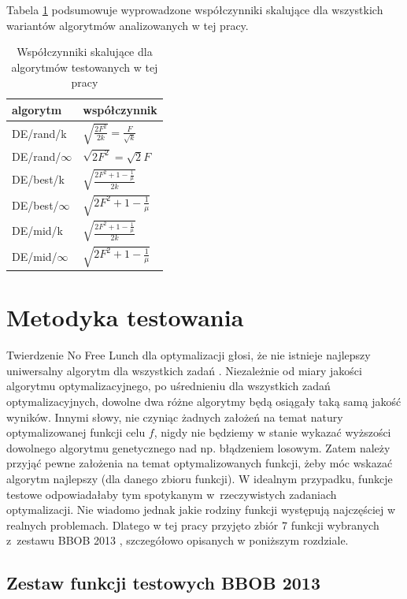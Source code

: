 \documentclass[a4paper,onecolumn,oneside,12pt,wide,floatssmall]{mwrep}
\theoremstyle{definition}
\theoremstyle{plain}%
\theoremstyle{remark}
\begin{document}
Tabela \ref{table:wspolczynniki} podsumowuje wyprowadzone współczynniki skalujące dla wszystkich
wariantów algorytmów analizowanych w tej pracy.

\begin{table}[H]
\centering
\begin{tabular}{ l | l }
algorytm         & współczynnik \\ \hline
DE/rand/k        & $\sqrt{\frac{2F^2}{2k}} = \frac{F}{\sqrt{k}}$ \\ 
DE/rand/$\infty$ & $\sqrt{2F^2} = \sqrt{2}F$ \\ \hline
DE/best/k        & $\sqrt{\frac{2F^2 + 1 - \frac{1}{\mu}}{2k}}$ \\
DE/best/$\infty$ & $\sqrt{2F^2 + 1 - \frac{1}{\mu}}$ \\ \hline
DE/mid/k         & $\sqrt{\frac{2F^2 + 1 - \frac{1}{\mu}}{2k}}$ \\
DE/mid/$\infty$  & $\sqrt{2F^2 + 1 - \frac{1}{\mu}}$ \\
\end{tabular}
\caption{Współczynniki skalujące dla algorytmów testowanych w tej pracy}
\label{table:wspolczynniki}
\end{table}

\chapter{Metodyka testowania}
\label{chap:metodyka}

Twierdzenie No Free Lunch dla optymalizacji głosi, że nie istnieje najlepszy uniwersalny algorytm dla wszystkich zadań \cite{lunch}. 
Niezależnie od miary jakości algorytmu optymalizacyjnego, po uśrednieniu dla wszystkich zadań optymalizacyjnych, 
dowolne dwa różne algorytmy będą osiągały taką samą jakość wyników. Innymi słowy,
nie czyniąc żadnych założeń na temat natury optymalizowanej funkcji celu $f$, 
nigdy nie będziemy w stanie wykazać wyższości dowolnego algorytmu genetycznego nad np. błądzeniem losowym. 
Zatem należy przyjąć pewne założenia na temat optymalizowanych funkcji, żeby móc wskazać algorytm najlepszy (dla danego zbioru funkcji).
W idealnym przypadku, funkcje testowe odpowiadałaby tym spotykanym w~rzeczywistych zadaniach optymalizacji.
Nie wiadomo jednak jakie rodziny funkcji występują najczęściej w realnych problemach.
Dlatego w tej pracy przyjęto zbiór 7 funkcji wybranych z~zestawu BBOB 2013 \cite{noiseless}, szczegółowo opisanych w poniższym rozdziale.

\section{Zestaw funkcji testowych BBOB 2013}
\label{sec:zestaw}
\end{document}

